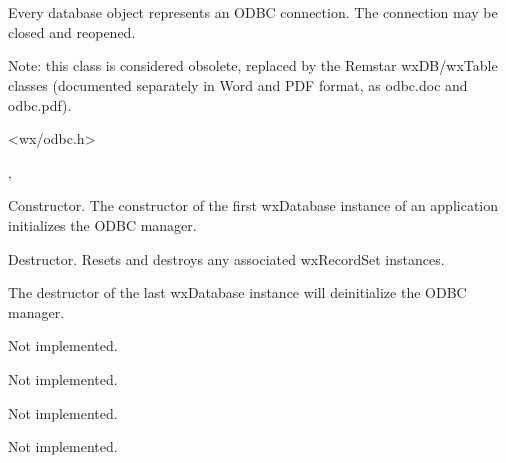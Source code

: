 \section{}\label{wxdatabase}

Every database object represents an ODBC connection.
The connection may be closed and reopened.

Note: this class is considered obsolete, replaced by the Remstar wxDB/wxTable classes
(documented separately in Word and PDF format, as odbc.doc and odbc.pdf).




<wx/odbc.h>


, 




Constructor. The constructor of the first wxDatabase instance of an
application initializes the ODBC manager.



Destructor. Resets and destroys any associated wxRecordSet instances.

The destructor of the last wxDatabase instance will deinitialize
the ODBC manager.



Not implemented.



Not implemented.



Not implemented.




Not implemented.

